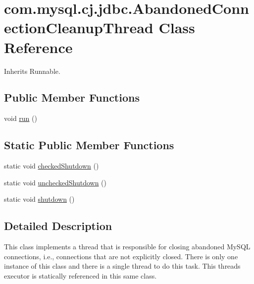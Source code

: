 \hypertarget{classcom_1_1mysql_1_1cj_1_1jdbc_1_1_abandoned_connection_cleanup_thread}{}\section{com.\+mysql.\+cj.\+jdbc.\+Abandoned\+Connection\+Cleanup\+Thread Class Reference}
\label{classcom_1_1mysql_1_1cj_1_1jdbc_1_1_abandoned_connection_cleanup_thread}


Inherits Runnable.

\subsection*{Public Member Functions}
\begin{DoxyCompactItemize}
\item 
void \mbox{\hyperlink{classcom_1_1mysql_1_1cj_1_1jdbc_1_1_abandoned_connection_cleanup_thread_ae80c545c3f55ec0a58a807e92f357d9d}{run}} ()
\end{DoxyCompactItemize}
\subsection*{Static Public Member Functions}
\begin{DoxyCompactItemize}
\item 
static void \mbox{\hyperlink{classcom_1_1mysql_1_1cj_1_1jdbc_1_1_abandoned_connection_cleanup_thread_a196b3b56aefdf849d19c4efabd56d241}{checked\+Shutdown}} ()
\item 
static void \mbox{\hyperlink{classcom_1_1mysql_1_1cj_1_1jdbc_1_1_abandoned_connection_cleanup_thread_aa78dca88c392400bfa168afddcb88ae1}{unchecked\+Shutdown}} ()
\item 
static void \mbox{\hyperlink{classcom_1_1mysql_1_1cj_1_1jdbc_1_1_abandoned_connection_cleanup_thread_a94b85a31e17329347409987ce3eb6daa}{shutdown}} ()
\end{DoxyCompactItemize}


\subsection{Detailed Description}
This class implements a thread that is responsible for closing abandoned My\+S\+QL connections, i.\+e., connections that are not explicitly closed. There is only one instance of this class and there is a single thread to do this task. This thread\textquotesingle{}s executor is statically referenced in this same class. 

